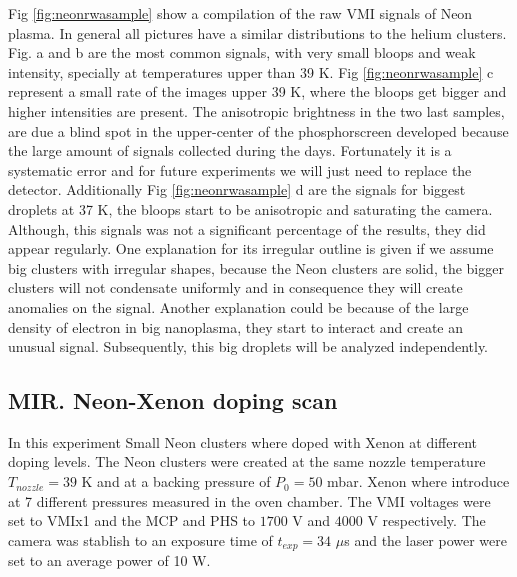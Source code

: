 Fig \ref{fig:neonrwasample} show a compilation of the raw VMI signals of Neon plasma. In general all pictures have a similar distributions to the helium clusters. Fig. a and b are the most common signals, with very small bloops and weak intensity, specially at temperatures upper than 39 K.  Fig \ref{fig:neonrwasample} c represent a small rate of the images upper 39 K, where the bloops get bigger and higher intensities are present. The anisotropic  brightness  in the two last samples, are due a blind spot in the upper-center of the phosphorscreen developed because the large amount of signals collected during the days. Fortunately it is a systematic error and for future experiments we will just need to replace the detector. Additionally Fig  \ref{fig:neonrwasample} d are the signals for biggest droplets  at 37 K, the bloops start to be anisotropic and saturating the camera. Although, this signals was not a significant percentage of the results, they did appear regularly. One explanation for its irregular outline is given if we assume big clusters with irregular shapes, because the Neon clusters are solid, the bigger clusters will not condensate uniformly and in consequence they will create anomalies on the signal. Another explanation could be because of the large density of electron in big nanoplasma, they start to interact and create an unusual signal. Subsequently, this big droplets will be analyzed independently. 

\subsection{MIR. Neon-Xenon doping scan}

In this experiment Small Neon clusters where doped with Xenon at different doping levels. The Neon clusters were created at the same nozzle temperature $T_{nozzle}=39$ K and at a backing pressure of $P_{0}=50$ mbar. Xenon where introduce at 7 different pressures measured in the oven chamber. The VMI voltages were set to VMIx1 and the MCP and PHS to $1700$ V and $4000$ V respectively. The camera was stablish to an exposure time of $t_{exp}=34$ $\mu$s  and the laser power were set to an average power of 10 W.


